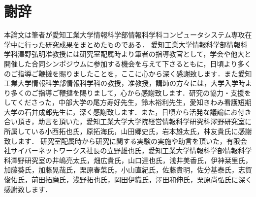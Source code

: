 \chapter*{謝辞}

本論文は筆者が愛知工業大学情報科学部情報科学科コンピュータシステム専攻在学中に行った研究成果をまとめたものである．
愛知工業大学情報科学部情報科学科澤野弘明准教授には研究室配属時より筆者の指導教官として，学会や他大と開催した合同シンポジウムに参加する機会を与えて下さるともに，日頃より多くのご指導ご鞭撻を賜りましたことを，ここに心から深く感謝致します．また愛知工業大学情報科学部情報科学科の教授，准教授，講師の方々には，大学入学時より多くのご指導ご鞭撻を賜りまして，心から感謝致します．研究の協力・支援をしてくださった，中部大学の尾方寿好先生，鈴木裕利先生，愛知きわみ看護短期大学の石井成郎先生に，深く感謝致します．また，日頃から活発な議論にお付き合い頂き，助言を頂いた，愛知工業大学大学院経営情報科学研究科澤野研究室に所属している小西拓也氏，原拓海氏，山田郷史氏，岩本雄太氏，林友貴氏に感謝致します．%
研究室配属時から研究に関する実験の実施や助言を頂いた，有限会社サイバーネットワークス社長の立野雄也氏，愛知工業大学情報科学部情報科学科澤野研究室の井嶋亮太氏，畑広貴氏，山口達也氏，浅井美香氏，伊神栞里氏，加藤葵氏，加藤晃哉氏，栗原春菜氏，小山直紀氏，佐藤貴明，佐分基泰氏，志賀俊佑氏，前田拓磨氏，浅野拓也氏，岡田伊織氏，澤田和伸氏，栗原尚弘氏に深く感謝致します．

